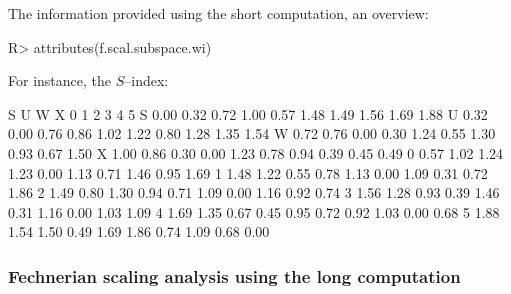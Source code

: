 \documentclass[nojss]{jss}
\begin{document}
The information provided using the short computation, an overview:
\begin{CodeChunk}
\begin{CodeInput}
R> attributes(f.scal.subspace.wi)
\end{CodeInput}
\end{CodeChunk}
For instance, the $S$--index:
\begin{CodeChunk}
\begin{CodeOutput}
     S    U    W    X    0    1    2    3    4    5
S 0.00 0.32 0.72 1.00 0.57 1.48 1.49 1.56 1.69 1.88
U 0.32 0.00 0.76 0.86 1.02 1.22 0.80 1.28 1.35 1.54
W 0.72 0.76 0.00 0.30 1.24 0.55 1.30 0.93 0.67 1.50
X 1.00 0.86 0.30 0.00 1.23 0.78 0.94 0.39 0.45 0.49
0 0.57 1.02 1.24 1.23 0.00 1.13 0.71 1.46 0.95 1.69
1 1.48 1.22 0.55 0.78 1.13 0.00 1.09 0.31 0.72 1.86
2 1.49 0.80 1.30 0.94 0.71 1.09 0.00 1.16 0.92 0.74
3 1.56 1.28 0.93 0.39 1.46 0.31 1.16 0.00 1.03 1.09
4 1.69 1.35 0.67 0.45 0.95 0.72 0.92 1.03 0.00 0.68
5 1.88 1.54 1.50 0.49 1.69 1.86 0.74 1.09 0.68 0.00
\end{CodeOutput}
\end{CodeChunk}

\subsubsection{Fechnerian scaling analysis using the long computation}
\end{document}
